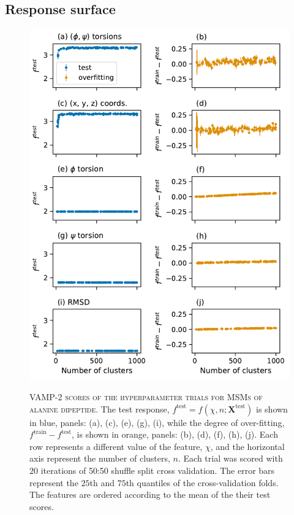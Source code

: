\subsection{Response surface}\label{sec:ala_rsm}

\begin{figure}[p]
    \centering
    \caption[VAMP-2 scores of the hyperparameter trials for MSMs of alanine dipeptide]{\textsc{VAMP-2 scores of the hyperparameter trials for MSMs of alanine dipeptide}. The test response, $f^{\mathrm{test}} = f(\chi, n; \mathbf{X}^{\mathrm{test}})$ is shown in blue, panels: (a), (c), (e), (g), (i),  while the degree of over-fitting, $f^{\mathrm{train}} - f^{\mathrm{test}}$, is shown in orange, panels: (b), (d), (f), (h), (j). Each row represents a different value of the feature, $\chi$, and the horizontal axis represent the number of clusters, $n$. Each trial was scored with $20$ iterations of 50:50 shuffle split cross validation. The error bars represent the $25$th and $75$th quantiles of the cross-validation folds. 
    The features are ordered according to the mean of the their test scores.}
    \includegraphics[height=0.8\textheight]{chapters/msm_optimization/figures/ala1_train_test_results.pdf}
    \label{fig:ala1_train_test}
\end{figure}

